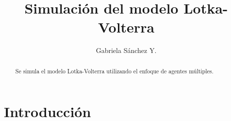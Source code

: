 \documentclass[12pt, twocolumns]{article}
\begin{document}



\title{Simulaci\'on del modelo Lotka-Volterra}


\author{Gabriela S\'anchez Y.}


\begin{abstract}

Se simula el modelo Lotka-Volterra utilizando el enfoque de agentes m\'ultiples.

\end{abstract}







\section{Introducci\'on}

\end{document}
